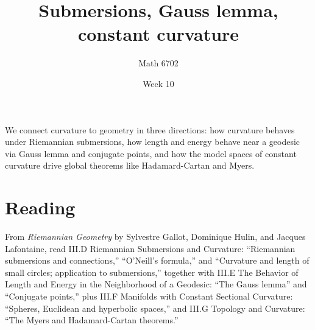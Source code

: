 \documentclass{article}
\title{Submersions, Gauss lemma, constant curvature}
\author{Math 6702}
\date{Week 10}
\begin{document}
\maketitle

We connect curvature to geometry in three directions: how curvature behaves under Riemannian submersions, how length and energy behave near a geodesic via Gauss lemma and conjugate points, and how the model spaces of constant curvature drive global theorems like Hadamard-Cartan and Myers.

\section*{Reading}
From \textit{Riemannian Geometry} by Sylvestre Gallot, Dominique Hulin, and Jacques Lafontaine, read \textsection III.D Riemannian Submersions and Curvature: ``Riemannian submersions and connections,'' ``O'Neill's formula,'' and ``Curvature and length of small circles; application to submersions,'' together with \textsection III.E The Behavior of Length and Energy in the Neighborhood of a Geodesic: ``The Gauss lemma'' and ``Conjugate points,'' plus \textsection III.F Manifolds with Constant Sectional Curvature: ``Spheres, Euclidean and hyperbolic spaces,'' and \textsection III.G Topology and Curvature: ``The Myers and Hadamard-Cartan theorems.''
\end{document}
